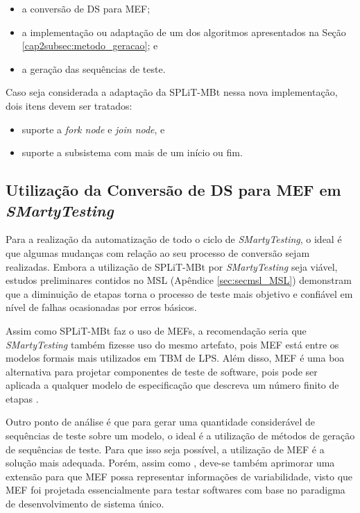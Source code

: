 \begin{itemize}
	\item a conversão de DS para MEF;
	\item a implementação ou adaptação de um dos algoritmos apresentados na Seção \ref{cap2subsec:metodo_geracao}; e
	\item a geração das sequências de teste.
\end{itemize}

Caso seja considerada a adaptação da SPLiT-MBt nessa nova implementação, dois itens devem ser tratados: 

\begin{itemize}
	\item suporte a \textit{fork node} e \textit{join node}, e
	\item suporte a subsistema com mais de um início ou fim.
\end{itemize}

\subsection{Utilização da Conversão de DS para MEF em \textit{SMartyTesting}}
Para a realização da automatização de todo o ciclo de \textit{SMartyTesting}, o ideal é que algumas mudanças com relação ao seu processo de conversão sejam realizadas. Embora a utilização de SPLiT-MBt por \textit{SMartyTesting} seja viável, estudos preliminares contidos no MSL (Apêndice \ref{sec:secmsl_MSL}) demonstram que a diminuição de etapas torna o processo de teste mais objetivo e confiável em nível de falhas ocasionadas por erros básicos.

Assim como SPLiT-MBt faz o uso de MEFs, a recomendação seria que \textit{SMartyTesting} também fizesse uso do mesmo artefato, pois MEF está entre os modelos formais mais utilizados em TBM de LPS. Além disso, MEF é uma boa alternativa para projetar componentes de teste de software, pois pode ser aplicada a qualquer modelo de especificação que descreva um número finito de etapas \cite{costa2016split}.

Outro ponto de análise é que para gerar uma quantidade considerável de sequências de teste sobre um modelo, o ideal é a utilização de métodos de geração de sequências de teste. Para que isso seja possível, a utilização de MEF é a solução mais adequada. Porém, assim como \citet{costa2016split}, deve-se também aprimorar uma extensão para que MEF possa representar informações de variabilidade, visto que MEF foi projetada essencialmente para testar softwares com base no paradigma de desenvolvimento de sistema único. 

